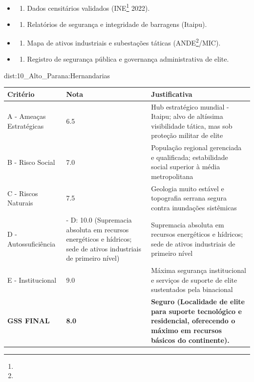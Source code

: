 {\begin{itemize}
\tightlist
\item
  \begin{enumerate}
  \def\labelenumi{\arabic{enumi})}
  \tightlist
  \item
    Dados censitários validados (INE\footnote{\fineINE} 2022).
  \end{enumerate}
\item
  \begin{enumerate}
  \def\labelenumi{\arabic{enumi})}
  \setcounter{enumi}{1}
  \tightlist
  \item
    Relatórios de segurança e integridade de barragens (Itaipu).
  \end{enumerate}
\item
  \begin{enumerate}
  \def\labelenumi{\arabic{enumi})}
  \setcounter{enumi}{2}
  \tightlist
  \item
    Mapa de ativos industriais e subestações táticas (ANDE\footnote{\fineANDE}/\allowbreak MIC).
  \end{enumerate}
\item
  \begin{enumerate}
  \def\labelenumi{\arabic{enumi})}
  \setcounter{enumi}{3}
  \tightlist
  \item
    Registro de segurança pública e governança administrativa de elite.
  \end{enumerate}
\end{itemize}}{dist:10_Alto_Parana:Hernandarias}
\begin{table}[ht!]
\small \begin{tabular}{p{3.0cm}p{0.8cm}p{6.0cm}} \toprule
\textbf{Critério} & \textbf{Nota} & \textbf{Justificativa} \\ \midrule
A - Ameaças Estratégicas & 6.5 & Hub estratégico mundial - Itaipu; alvo de altíssima visibilidade tática, mas sob proteção militar de elite \\
B - Risco Social & 7.0 & População regional gerenciada e qualificada; estabilidade social superior à média metropolitana \\
C - Riscos Naturais & 7.5 & Geologia muito estável e topografia serrana segura contra inundações sistêmicas \\
D - Autossuficiência & - D: 10.0 (Supremacia absoluta em recursos energéticos e hídricos; sede de ativos industriais de primeiro nível) & Supremacia absoluta em recursos energéticos e hídricos; sede de ativos industriais de primeiro nível \\
E - Institucional & 9.0 & Máxima segurança institucional e serviços de suporte de elite sustentados pela binacional \\
\midrule \textbf{GSS FINAL} & \textbf{8.0} & \textbf{Seguro (Localidade de elite para suporte tecnológico e residencial, oferecendo o máximo em recursos básicos do continente).} \\ \bottomrule \end{tabular}
\end{table}
